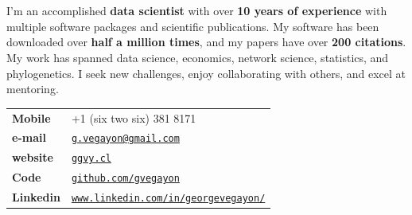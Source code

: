 \documentclass[letterpaper, 9pt]{article}
\newcommand{\myorange}{myteal!70!black}
\renewcommand{\bf}{\bfseries\color{\myorange}}
\renewcommand{\textbf}[1]{{\bfseries\color{\myorange}#1}}
\def\name{George G. Vega Yon, Ph.D.}
\begin{document}
% 	
	\vspace{-1.75cm}
	\part*{\color{darkgray}{\name} } 
	
	\vspace{-.4cm}
	\bigskip


	\begin{minipage}{.9\linewidth}
	\raggedright
	I'm an accomplished \textbf{data scientist} with over \textbf{10 years of experience} with multiple software packages and scientific publications. My software has been downloaded over \textbf{half a million times}, and my papers have over \textbf{200 citations}. My work has spanned data science, economics, network science, statistics, and phylogenetics. I seek new challenges, enjoy collaborating with others, and excel at mentoring.
	\end{minipage}

	\bigskip



\begin{minipage}{0.50\linewidth}
  \begin{tabular}{>{\bfseries}p{.2\linewidth}p{.79\linewidth}}
    Mobile & +1 (six two six) 381 8171 \\
    e-mail & \href{mailto:g.vegayon@gmail.com}{\tt g.vegayon@gmail.com} \\
    website & \href{https://ggvy.cl}{\tt ggvy.cl} \\
    Code & \href{https://github.com/gvegayon}{\tt github.com/gvegayon}\\
    Linkedin & \href{https://www.linkedin.com/in/georgevegayon/}{\tt www.linkedin.com/in/georgevegayon/} %
  \end{tabular}
\end{minipage}
\end{document}
